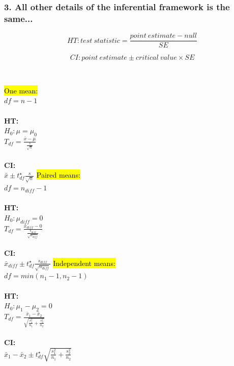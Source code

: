 \documentclass[t,compress,mathserif,11pt,t,professionalfonts,xcolor=table]{beamer}
\begin{document}
\begin{frame}
\frametitle{3. All other details of the inferential framework is the same...}
\small{
\[ HT: test~statistic = \frac{point~estimate - null}{SE} \]

\pause

\[ CI: point~estimate \pm critical~value \times SE \]

\pause

$\:$ \\
}
{
\hl{One mean:} \\
{\small $df = n - 1$} \\
$\:$ \\
\textbf{HT:} \\
$H_0: \mu = \mu_0$ \\
$T_{df} = \frac{\bar{x} - \mu}{\frac{s}{\sqrt{n}}}$ \\
$\:$ \\
\textbf{CI:} \\
$\bar{x} \pm t^\star_{df} \frac{s}{\sqrt{n}}$
}
{\pause
\hl{Paired means:} \\
{\small $df = n_{diff} - 1$}
$\:$ \\$\:$ \\
\textbf{HT:} \\
$H_0: \mu_{diff} = 0$ \\
$T_{df} = \frac{\bar{x}_{diff} -0}{\frac{s_{diff}}{\sqrt{n_{diff}}}}$ \\
$\:$ \\
\textbf{CI:} \\
$\bar{x}_{diff} \pm t^\star_{df} \frac{s_{diff}}{\sqrt{n_{diff}}}$
}
{\pause
\hl{Independent means:} \\
{\small $df = min(n_1 - 1, n_2 - 1)$}
$\:$ \\$\:$ \\
\textbf{HT:} \\
$H_0: \mu_1 - \mu_2 = 0$ \\
$T_{df} = \frac{\bar{x}_1 - \bar{x}_2}{\sqrt{ \frac{s_1^2}{n_1} + \frac{s_2^2}{n_2} }}$ \\
$\:$ \\
\textbf{CI:} \\
$\bar{x}_1 - \bar{x}_2 \pm t^\star_{df} \sqrt{ \frac{s_1^2}{n_1} + \frac{s_2^2}{n_2} }$
}



\end{frame}






\end{document}
